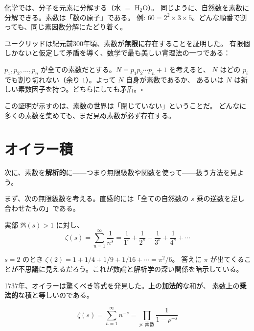 \begin{hsbox}
化学では、分子を元素に分解する（水 $=$ H${}_2$O）。
同じように、自然数を素数に分解できる。素数は「数の原子」である。
例: $60 = 2^2 \times 3 \times 5$。どんな順番で割っても、同じ素因数分解にたどり着く。
\end{hsbox}

ユークリッドは紀元前300年頃、素数が\textbf{無限に}存在することを証明した。
有限個しかないと仮定して矛盾を導く、数学で最も美しい背理法の一つである：

$p_1, p_2, \ldots, p_n$ が全ての素数だとする。$N = p_1 p_2 \cdots p_n + 1$ を考えると、
$N$ はどの $p_i$ でも割り切れない（余り $1$）。よって $N$ 自身が素数であるか、
あるいは $N$ は新しい素数因子を持つ。どちらにしても矛盾。$\square$

この証明が示すのは、素数の世界は「閉じていない」ということだ。
どんなに多くの素数を集めても、まだ見ぬ素数が必ず存在する。

\section{オイラー積}
\label{sec:1.2}

次に、素数を\textbf{解析的}に——つまり無限級数や関数を使って——扱う方法を見よう。

まず、次の無限級数を考える。直感的には「全ての自然数の $s$ 乗の逆数を足し合わせたもの」である。

\begin{dfnbox}[定義: リーマンのゼータ関数]
実部 $\Re(s) > 1$ に対し、
\[
  \zeta(s) = \sum_{n=1}^{\infty} \frac{1}{n^s}
           = \frac{1}{1^s} + \frac{1}{2^s} + \frac{1}{3^s} + \frac{1}{4^s} + \cdots
\]
\end{dfnbox}

\begin{hsbox}
$s=2$ のとき $\zeta(2) = 1 + 1/4 + 1/9 + 1/16 + \cdots = \pi^2/6$。
答えに $\pi$ が出てくることが不思議に見えるだろう。これが数論と解析学の深い関係を暗示している。
\end{hsbox}

1737年、オイラーは驚くべき等式を発見した。上の\textbf{加法的}な和が、
素数上の\textbf{乗法的}な積と等しいのである。

\begin{keybox}[オイラー積公式]
\[
  \zeta(s) = \sum_{n=1}^{\infty} n^{-s}
           = \prod_{p:\,\text{素数}} \frac{1}{1 - p^{-s}}
\]
\end{keybox}

